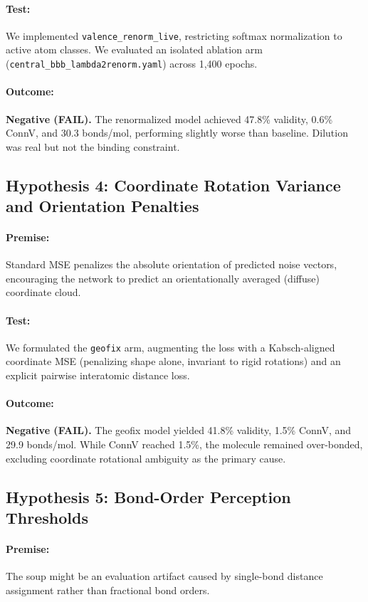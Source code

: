 \documentclass[12pt, a4paper]{article}
\begin{document}
\paragraph{Test:} We implemented \texttt{valence\_renorm\_live}, restricting softmax normalization to active atom classes. We evaluated an isolated ablation arm (\texttt{central\_bbb\_lambda2renorm.yaml}) across 1,400 epochs.
\paragraph{Outcome:} \textbf{Negative (FAIL).} The renormalized model achieved 47.8\% validity, 0.6\% ConnV, and 30.3 bonds/mol, performing slightly worse than baseline. Dilution was real but not the binding constraint.

\subsection{Hypothesis 4: Coordinate Rotation Variance and Orientation Penalties}
\paragraph{Premise:} Standard MSE penalizes the absolute orientation of predicted noise vectors, encouraging the network to predict an orientationally averaged (diffuse) coordinate cloud.
\paragraph{Test:} We formulated the \texttt{geofix} arm, augmenting the loss with a Kabsch-aligned coordinate MSE (penalizing shape alone, invariant to rigid rotations) and an explicit pairwise interatomic distance loss.
\paragraph{Outcome:} \textbf{Negative (FAIL).} The geofix model yielded 41.8\% validity, 1.5\% ConnV, and 29.9 bonds/mol. While ConnV reached 1.5\%, the molecule remained over-bonded, excluding coordinate rotational ambiguity as the primary cause.

\subsection{Hypothesis 5: Bond-Order Perception Thresholds}
\paragraph{Premise:} The soup might be an evaluation artifact caused by single-bond distance assignment rather than fractional bond orders.
\end{document}
